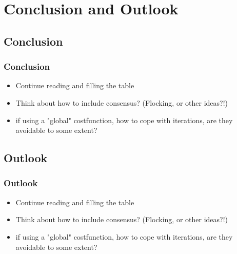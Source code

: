 \section{Conclusion and Outlook}

\subsection{Conclusion}
    \begin{frame}
        \frametitle{Conclusion}
        \begin{itemize}
            \item Continue reading and filling the table
            \item Think about how to include consensus? (Flocking, or other ideas?!)
            \item if using a "global" costfunction, how to cope with iterations, are they avoidable to some extent?
        \end{itemize}
    \end{frame}

\subsection{Outlook}
    \begin{frame}
        \frametitle{Outlook}
        \begin{itemize}
            \item Continue reading and filling the table
            \item Think about how to include consensus? (Flocking, or other ideas?!)
            \item if using a "global" costfunction, how to cope with iterations, are they avoidable to some extent?
        \end{itemize}
    \end{frame}